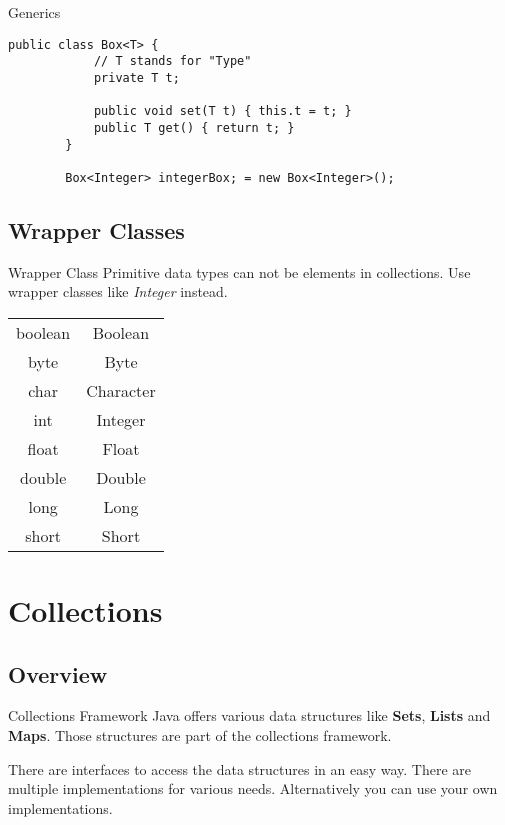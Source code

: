 \begin{frame}[fragile]{Generics}
    \begin{lstlisting}[basicstyle=\ttfamily\scriptsize]
        public class Box<T> {
            // T stands for "Type"
            private T t;

            public void set(T t) { this.t = t; }
            public T get() { return t; }
        }
        
        Box<Integer> integerBox; = new Box<Integer>();

    \end{lstlisting}
\end{frame}

\subsection{Wrapper Classes}

\begin{frame}{Wrapper Class}
    Primitive data types can not be elements in collections. 
    Use wrapper classes like \emph{Integer} instead.
    \begin{center}
        \begin{tabular}{ c  c }
            boolean & Boolean \\
            byte & Byte \\
            char & Character \\
            int & Integer \\
            float & Float \\
            double & Double \\
            long & Long \\
            short & Short
        \end{tabular}
    \end{center}
\end{frame}

\section{Collections}
\subsection{Overview}
\begin{frame}{Collections Framework}
    Java offers various data structures like \textbf{Sets}, \textbf{Lists} and \textbf{Maps}.
    Those structures are part of the collections framework.

    There are interfaces to access the data structures in an easy way.
    There are multiple implementations for various needs.
    Alternatively you can use your own implementations.
\end{frame}

